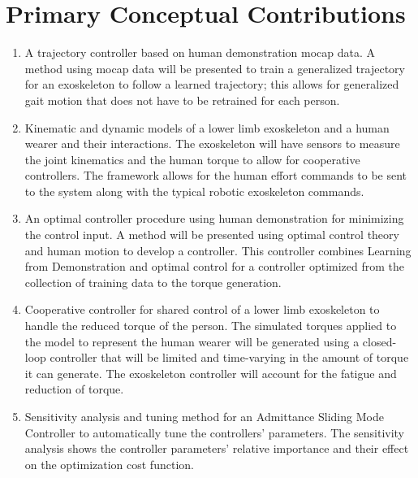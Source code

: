 \section{Primary Conceptual Contributions}
\begin{enumerate}[wide, nosep, labelindent = 0pt, topsep = 1ex]
     \item A trajectory controller based on human demonstration mocap data. A method using mocap data will be presented to train a generalized trajectory for an exoskeleton to follow a learned trajectory; this allows for generalized gait motion that does not have to be retrained for each person. 
    \item  Kinematic and dynamic models of a lower limb exoskeleton and a human wearer and their interactions. The exoskeleton will have sensors to measure the joint kinematics and the human torque to allow for cooperative controllers. The framework allows for the human effort commands to be sent to the system along with the typical robotic exoskeleton commands. 
    \item An optimal controller procedure using human demonstration for minimizing the control input. A method will be presented using optimal control theory and human motion to develop a controller. This controller combines Learning from Demonstration and optimal control for a controller optimized from the collection of training data to the torque generation. 
    \item Cooperative controller for shared control of a lower limb exoskeleton to handle the reduced torque of the person. The simulated torques applied to the model to represent the human wearer will be generated using a closed-loop controller that will be limited and time-varying in the amount of torque it can generate. The exoskeleton controller will account for the fatigue and reduction of torque. 
    \item Sensitivity analysis and tuning method for an Admittance Sliding Mode Controller to automatically tune the controllers' parameters. The sensitivity analysis shows the controller parameters' relative importance and their effect on the optimization cost function.  
\end{enumerate}

